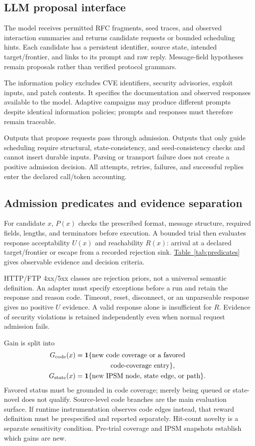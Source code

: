 \documentclass[final,5p,times,number]{elsarticle}
\newcommand{\gcode}{G_{\mathrm{code}}}
\newcommand{\gstate}{G_{\mathrm{state}}}
\newcommand{\namedref}[2]{\hyperref[#2]{#1~\ref*{#2}}}
\begin{document}
\subsection{LLM proposal interface}
The model receives permitted RFC fragments, seed traces, and observed interaction summaries and returns candidate requests or bounded scheduling hints. Each candidate has a persistent identifier, source state, intended target/frontier, and links to its prompt and raw reply. Message-field hypotheses remain proposals rather than verified protocol grammars.

The information policy excludes CVE identifiers, security advisories, exploit inputs, and patch contents. It specifies the documentation and observed responses available to the model. Adaptive campaigns may produce different prompts despite identical information policies; prompts and responses must therefore remain traceable.

Outputs that propose requests pass through admission. Outputs that only guide scheduling require structural, state-consistency, and seed-consistency checks and cannot insert durable inputs. Parsing or transport failure does not create a positive admission decision. All attempts, retries, failures, and successful replies enter the declared call/token accounting.

\subsection{Admission predicates and evidence separation}
For candidate $x$, $P(x)$ checks the prescribed format, message structure, required fields, lengths, and terminators before execution. A bounded trial then evaluates response acceptability $U(x)$ and reachability $R(x)$: arrival at a declared target/frontier or escape from a recorded rejection sink. \namedref{Table}{tab:predicates} gives observable evidence and decision criteria.

HTTP/FTP 4xx/5xx classes are rejection priors, not a universal semantic definition. An adapter must specify exceptions before a run and retain the response and reason code. Timeout, reset, disconnect, or an unparseable response gives no positive $U$ evidence. A valid response alone is insufficient for $R$. Evidence of security violations is retained independently even when normal request admission fails.

Gain is split into
\begin{align}
\gcode(x)&=\mathbf{1}\{\text{new code coverage or a favored}\nonumber\\
&\hspace{18mm}\text{code-coverage entry}\},\label{eq:gcode}\\
\gstate(x)&=\mathbf{1}\{\text{new IPSM node, state edge, or path}\}.\label{eq:gstate}
\end{align}
Favored status must be grounded in code coverage; merely being queued or state-novel does not qualify. Source-level code branches are the main evaluation surface. If runtime instrumentation observes code edges instead, that reward definition must be prespecified and reported separately. Hit-count novelty is a separate sensitivity condition. Pre-trial coverage and IPSM snapshots establish which gains are new.
\end{document}
